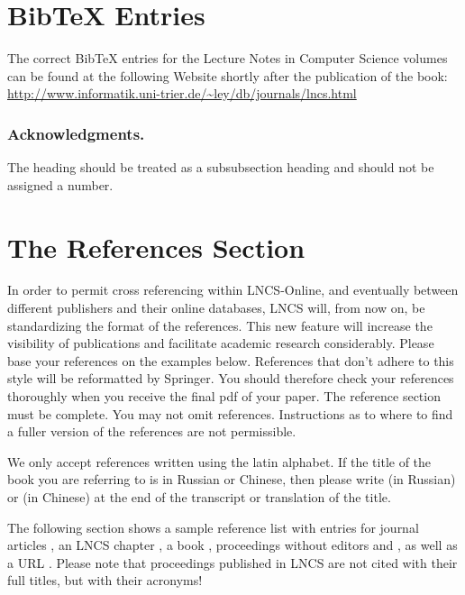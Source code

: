 \documentclass{book}
\begin{document}
\section{BibTeX Entries}

The correct BibTeX entries for the Lecture Notes in Computer Science
volumes can be found at the following Website shortly after the
publication of the book:
\url{http://www.informatik.uni-trier.de/~ley/db/journals/lncs.html}

\subsubsection*{Acknowledgments.} The heading should be treated as a
subsubsection heading and should not be assigned a number.

\section{The References Section}\label{references}

In order to permit cross referencing within LNCS-Online, and eventually
between different publishers and their online databases, LNCS will,
from now on, be standardizing the format of the references. This new
feature will increase the visibility of publications and facilitate
academic research considerably. Please base your references on the
examples below. References that don't adhere to this style will be
reformatted by Springer. You should therefore check your references
thoroughly when you receive the final pdf of your paper.
The reference section must be complete. You may not omit references.
Instructions as to where to find a fuller version of the references are
not permissible.

We only accept references written using the latin alphabet. If the title
of the book you are referring to is in Russian or Chinese, then please write
(in Russian) or (in Chinese) at the end of the transcript or translation
of the title.

The following section shows a sample reference list with entries for
journal articles \cite{jour}, an LNCS chapter \cite{lncschap}, a book
\cite{book}, proceedings without editors \cite{proceeding1} and
\cite{proceeding2}, as well as a URL \cite{url}.
Please note that proceedings published in LNCS are not cited with their
full titles, but with their acronyms!
\end{document}
